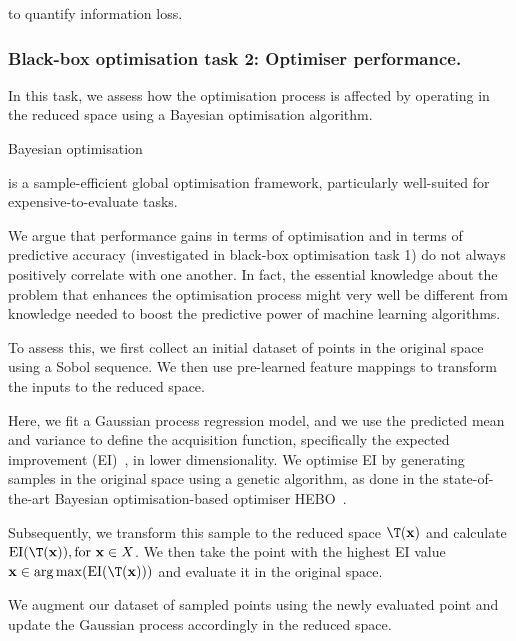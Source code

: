 to quantify information loss.



\subsubsection*{Black-box optimisation task 2: Optimiser performance.}
\label{sec:ch04:method-bbo-task3}
In this task, we assess how the optimisation process is affected by operating in the reduced space using a Bayesian optimisation algorithm.

Bayesian optimisation~\citep{Garnett23} 

is a sample-efficient global optimisation framework, particularly well-suited for expensive-to-evaluate tasks.


We argue that performance gains in terms of optimisation and in terms of predictive accuracy (investigated in  black-box optimisation task 1) do not always positively correlate with one another. 
In fact, the essential knowledge about the problem that enhances the optimisation process might very well be different from knowledge needed to boost the predictive power of machine learning algorithms.

To assess this, we first collect an initial dataset of points in the original space using a Sobol sequence.
We then use pre-learned feature mappings to transform the inputs to the reduced space. 


Here, we fit a Gaussian process regression model, and we use the predicted mean and variance to define the acquisition function, specifically the expected improvement (EI)~\citep{SobEtAl08}, in lower dimensionality.  
We optimise EI by generating samples in the original space using a genetic algorithm, as done in the state-of-the-art Bayesian optimisation-based optimiser HEBO~\citep{CowEtAl22}. 








Subsequently, we transform this sample to the reduced space $\T(\mathbf{x})$ and calculate $\text{EI}(\T(\mathbf{x})), \text{for } \mathbf{x} \in X$. 
We then take the point with the highest EI value $\mathbf{x} \in \arg\max(\text{EI}(\T(\mathbf{x})))$ and evaluate it in the original space. 

We augment our dataset of sampled points using the newly evaluated point and update the Gaussian process accordingly in the reduced space.







